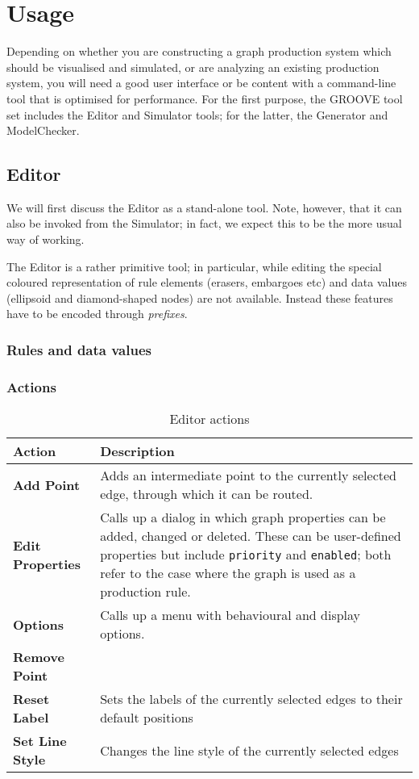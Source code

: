 \section{Usage}
\suppressfloats[t]

Depending on whether you are constructing a graph production system which
should be visualised and simulated, or are analyzing an existing production
system, you will need a good user interface or be content with a command-line
tool that is optimised for performance. For the first purpose, the GROOVE
tool set includes the Editor and Simulator tools; for the latter, the Generator 
and ModelChecker.

\subsection{Editor}

We will first discuss the Editor as a stand-alone tool. Note, however, that it
can also be invoked from the Simulator; in fact, we expect this to be the more
usual way of working.

The Editor is a rather primitive tool; in particular, while editing the
special coloured representation of rule elements (erasers, embargoes etc) and
data values (ellipsoid and diamond-shaped nodes) are not available. Instead
these features have to be encoded through \emph{prefixes}.

\subsubsection{Rules and data values}

\subsubsection{Actions}

\begin{table}
\begin{center}
\begin{tabular}{|p{5cm}|p{8cm}|}
\hline\hline
\bf Action & \bf Description \\
\hline
\bf Add Point
 & Adds an intermediate point to the currently selected edge, through which it
 can be routed. \\
\bf Edit Properties
 & Calls up a dialog in which graph properties can be added, changed or
 deleted. These can be user-defined properties but include \texttt{priority}
 and \texttt{enabled}; both refer to the case where the graph is used as a
 production rule. \\
\bf Options 
 & Calls up a menu with behavioural and display options. \\
\bf Remove Point
 & \\
\bf Reset Label
 & Sets the labels of the currently selected edges to their default positions \\
\bf Set Line Style
 & Changes the line style of the currently selected edges \\
\hline\hline
\end{tabular}
\end{center}
\caption{Editor actions}
\end{table}


